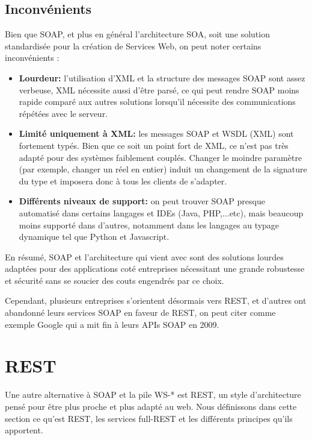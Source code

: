 \subsection{Inconvénients}
Bien que SOAP, et plus en général l'architecture SOA, soit une solution standardisée pour la création de Services Web, on peut noter certains inconvénients :
\begin{itemize}
	\item \textbf{Lourdeur:} l'utilisation d'XML et la structure des messages SOAP sont assez verbeuse, XML nécessite aussi d'être parsé, ce qui peut rendre SOAP moins rapide comparé aux autres solutions lorsqu'il nécessite des communications répétées avec le serveur.
	\item \textbf{Limité uniquement à XML:} les messages SOAP et WSDL (XML) sont fortement typés. Bien que ce soit un point fort de XML, ce n'est pas très adapté pour des systèmes faiblement couplés. Changer le moindre paramètre (par exemple, changer un réel en entier) induit un changement de la signature du type et imposera donc à tous les clients de s'adapter.
	\item \textbf{Différents niveaux de support:} on peut trouver SOAP presque automatisé dans certains langages et IDEs (Java, PHP,...etc), mais beaucoup moins supporté dans d'autres, notamment dans les langages au typage dynamique tel que Python et Javascript.
\end{itemize}

En résumé, SOAP et l'architecture qui vient avec sont des solutions lourdes adaptées pour des applications coté entreprises nécessitant une grande robustesse et sécurité sans se soucier des couts engendrés par ce choix.

Cependant, plusieurs entreprises s'orientent désormais vers REST, et d'autres ont abandonné leurs services SOAP en faveur de REST, on peut citer comme exemple Google qui a mit fin à leurs APIs SOAP en 2009.
\newpage

\section{REST}
\label{section:Rest}
Une autre alternative à SOAP et la pile WS-* est REST, un style d'architecture pensé pour être plus proche et plus adapté au web. Nous définissons dans cette section ce qu'est REST, les services full-REST et les différents principes qu'ils apportent.

